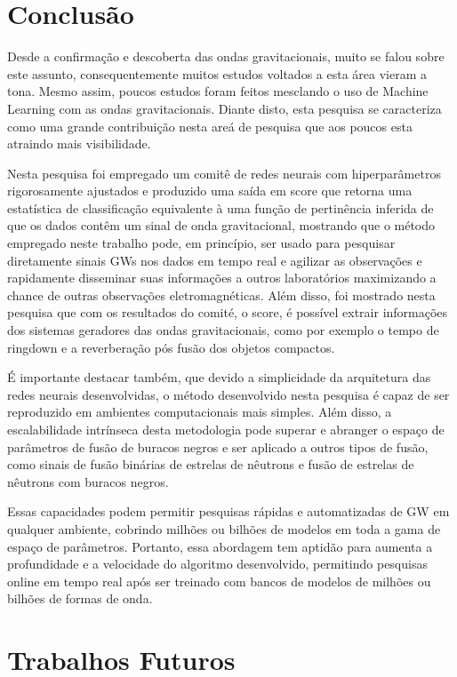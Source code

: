 \chapter{Conclusão}
\label{chap:conclusao}

Desde a confirmação e descoberta das ondas gravitacionais, muito se falou sobre este assunto, consequentemente muitos estudos voltados a esta área vieram a tona. Mesmo assim, poucos estudos foram feitos mesclando o uso de Machine Learning com as ondas gravitacionais. Diante disto, esta pesquisa se caracteriza como uma grande contribuição nesta areá de pesquisa que aos poucos esta atraindo mais visibilidade. 

Nesta pesquisa foi empregado um comitê de redes neurais com hiperparâmetros rigorosamente ajustados e produzido uma saída em score que retorna uma estatística de classificação equivalente à uma função de pertinência inferida de que os dados contêm um sinal de onda gravitacional, mostrando que o método empregado neste trabalho pode, em princípio, ser usado para pesquisar diretamente sinais GWs nos dados em tempo real e agilizar as observações e rapidamente disseminar suas informações a outros laboratórios  maximizando a chance de outras observações eletromagnéticas. Além disso, foi mostrado nesta pesquisa que com os resultados do comité, o score, é possível extrair informações dos sistemas geradores das ondas gravitacionais, como por exemplo o tempo de ringdown e a reverberação pós fusão dos objetos compactos.

É importante destacar também, que devido a simplicidade da arquitetura das redes neurais desenvolvidas, o método desenvolvido nesta pesquisa é capaz de ser reproduzido em ambientes computacionais mais simples. Além disso, a escalabilidade intrínseca desta metodologia pode superar e abranger o espaço de parâmetros de fusão de buracos negros e ser aplicado a outros tipos de fusão, como sinais de fusão binárias de estrelas de nêutrons e fusão de estrelas de nêutrons com buracos negros. 

Essas capacidades podem permitir pesquisas rápidas e automatizadas de GW em qualquer ambiente, cobrindo milhões ou bilhões de modelos em toda a gama de espaço de parâmetros. Portanto, essa abordagem tem aptidão para aumenta a profundidade e a velocidade do algoritmo desenvolvido, permitindo pesquisas online em tempo real após ser treinado com bancos de modelos de milhões ou bilhões de formas de onda.

\chapter{Trabalhos Futuros}

